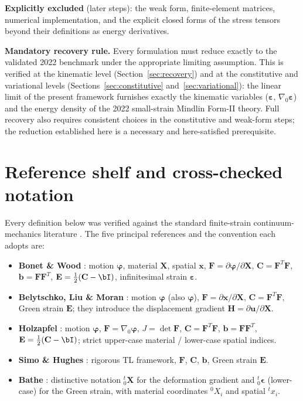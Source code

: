 \documentclass[11pt]{article}
\newcommand{\gradz}{\nabla_{0}}
\newcommand{\bX}{\mathbf{X}}
\newcommand{\bx}{\mathbf{x}}
\newcommand{\bp}{\boldsymbol{\varphi}}
\newcommand{\bu}{\mathbf{u}}
\newcommand{\bF}{\mathbf{F}}
\newcommand{\bC}{\mathbf{C}}
\newcommand{\bb}{\mathbf{b}}
\newcommand{\bE}{\mathbf{E}}
\newcommand{\bep}{\boldsymbol{\varepsilon}}
\newcommand{\bH}{\mathbf{H}}
\newcommand{\gradz}{\nabla_{0}}
\newcommand{\bX}{\mathbf{X}}
\newcommand{\bx}{\mathbf{x}}
\newcommand{\bp}{\boldsymbol{\varphi}}
\newcommand{\bphi}{\boldsymbol{\varphi}}
\newcommand{\bu}{\mathbf{u}}
\newcommand{\bF}{\mathbf{F}}
\newcommand{\bC}{\mathbf{C}}
\newcommand{\bb}{\mathbf{b}}
\newcommand{\bE}{\mathbf{E}}
\newcommand{\bep}{\boldsymbol{\varepsilon}}
\newcommand{\bH}{\mathbf{H}}
\begin{document}
\textbf{Explicitly excluded} (later steps): the weak form, finite-element
matrices, numerical implementation, and the explicit closed forms of the
stress tensors beyond their definitions as energy derivatives.

\textbf{Mandatory recovery rule.} Every formulation must reduce exactly
to the validated 2022 benchmark under the appropriate limiting
assumption. This is verified at the kinematic level (Section~\ref{sec:recovery})
and at the constitutive and variational levels (Sections~\ref{sec:constitutive} and~\ref{sec:variational}): the
linear limit of the present framework furnishes exactly the kinematic
variables ($\bep$, $\gradz\bep$) and the energy density of the 2022
small-strain Mindlin Form-II theory. Full recovery also requires
consistent choices in the constitutive and weak-form steps; the
reduction established here is a necessary and here-satisfied
prerequisite.

\section{Reference shelf and cross-checked notation}

Every definition below was verified against the standard
finite-strain continuum-mechanics literature
\cite{BonetWood2008,Belytschko2000,Holzapfel2000,SimoHughes1998,Bathe2006}.
The five principal references and the convention each adopts are:

\begin{itemize}
\item \textbf{Bonet \& Wood} \cite{BonetWood2008}: motion $\bp$, material
$\bX$, spatial $\bx$, $\bF=\partial\bp/\partial\bX$,
$\bC=\bF^{T}\bF$, $\bb=\bF\bF^{T}$, $\bE=\tfrac12(\bC-\bI)$,
infinitesimal strain $\bep$.

\item \textbf{Belytschko, Liu \& Moran} \cite{Belytschko2000}: motion
$\bp$ (also $\bphi$), $\bF=\partial\bx/\partial\bX$, $\bC=\bF^{T}\bF$,
Green strain $\bE$; they introduce the displacement gradient
$\bH=\partial\bu/\partial\bX$.

\item \textbf{Holzapfel} \cite{Holzapfel2000}: motion $\bp$,
$\bF=\gradz\bp$, $J=\det\bF$, $\bC=\bF^{T}\bF$, $\bb=\bF\bF^{T}$,
$\bE=\tfrac12(\bC-\bI)$; strict upper-case material / lower-case
spatial indices.

\item \textbf{Simo \& Hughes} \cite{SimoHughes1998}: rigorous TL
framework, $\bF$, $\bC$, $\bb$, Green strain $\bE$.

\item \textbf{Bathe} \cite{Bathe2006}: distinctive notation
${}^{t}_{0}\mathbf{X}$ for the deformation gradient and
${}^{t}_{0}\boldsymbol{\epsilon}$ (lower-case) for the Green strain,
with material coordinates ${}^{0}X_{i}$ and spatial ${}^{t}x_{i}$.
\end{itemize}
\end{document}
